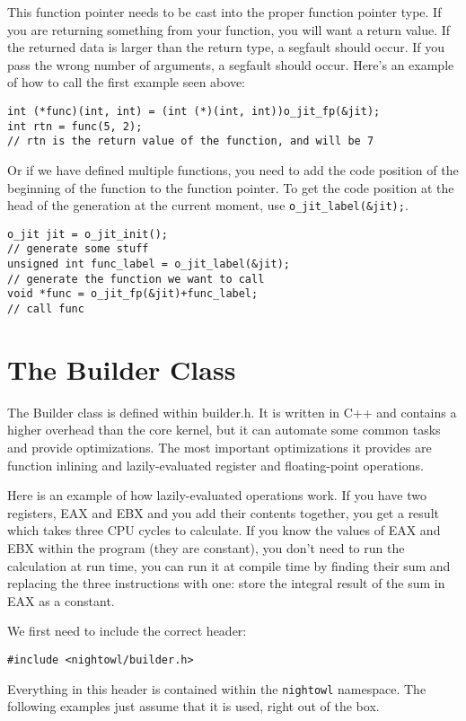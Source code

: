 \documentclass[10pt,a4paper]{article}
\begin{document}
This function pointer needs to be cast into the proper function pointer type. If you are returning something from your function, you will want a return value. If the returned data is larger than the return type, a segfault should occur. If you pass the wrong number of arguments, a segfault should occur. Here's an example of how to call the first example seen above:
\begin{verbatim}
int (*func)(int, int) = (int (*)(int, int))o_jit_fp(&jit);
int rtn = func(5, 2);
// rtn is the return value of the function, and will be 7
\end{verbatim}

Or if we have defined multiple functions, you need to add the code position of the beginning of the function to the function pointer. To get the code position at the head of the generation at the current moment, use \verb|o_jit_label(&jit);|.

\begin{verbatim}
o_jit jit = o_jit_init();
// generate some stuff
unsigned int func_label = o_jit_label(&jit);
// generate the function we want to call
void *func = o_jit_fp(&jit)+func_label;
// call func
\end{verbatim}

\section{The Builder Class}
The Builder class is defined within builder.h. It is written in C++ and contains a higher overhead than the core kernel, but it can automate some common tasks and provide optimizations. The most important optimizations it provides are function inlining and lazily-evaluated register and floating-point operations. 

Here is an example of how lazily-evaluated operations work. If you have two registers, EAX and EBX and you add their contents together, you get a result which takes three CPU cycles to calculate. If you know the values of EAX and EBX within the program (they are constant), you don't need to run the calculation at run time, you can run it at compile time by finding their sum and replacing the three instructions with one: store the integral result of the sum in EAX as a constant.

We first need to include the correct header:
\begin{verbatim}
#include <nightowl/builder.h>
\end{verbatim}

Everything in this header is contained within the \verb|nightowl| namespace. The following examples just assume that it is used, right out of the box.
\end{document}
